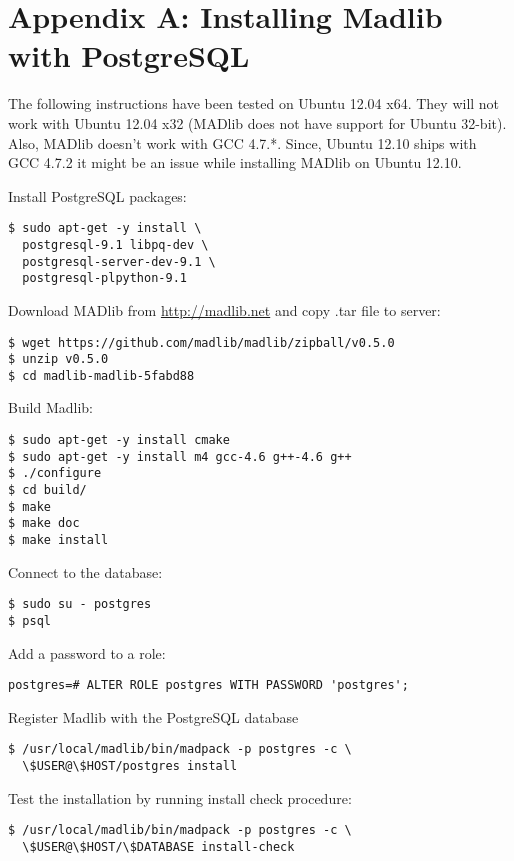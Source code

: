 
\section*{Appendix A: Installing Madlib with PostgreSQL}
The following instructions have been tested on Ubuntu 12.04 x64. They will not work with Ubuntu 12.04 x32 (MADlib does not have support for Ubuntu 32-bit). Also, MADlib doesn't work with GCC 4.7.*. Since,  Ubuntu 12.10 ships with GCC 4.7.2 it might be an issue while installing MADlib on Ubuntu 12.10.

\vspace{\baselineskip}
{\raggedleft Install PostgreSQL packages:}
\begin{verbatim}
$ sudo apt-get -y install \
  postgresql-9.1 libpq-dev \
  postgresql-server-dev-9.1 \
  postgresql-plpython-9.1
\end{verbatim}

{\raggedleft Download MADlib from \url{http://madlib.net} and copy .tar file to server:}
\begin{verbatim}
$ wget https://github.com/madlib/madlib/zipball/v0.5.0
$ unzip v0.5.0
$ cd madlib-madlib-5fabd88
\end{verbatim}

{\raggedleft Build Madlib:}
\begin{verbatim}
$ sudo apt-get -y install cmake
$ sudo apt-get -y install m4 gcc-4.6 g++-4.6 g++
$ ./configure
$ cd build/
$ make
$ make doc
$ make install
\end{verbatim}

{\raggedleft Connect to the database:}
\begin{verbatim}
$ sudo su - postgres
$ psql
\end{verbatim}

{\raggedleft Add a password to a role:}
\begin{verbatim}
postgres=# ALTER ROLE postgres WITH PASSWORD 'postgres';
\end{verbatim}

{\raggedleft Register Madlib with the PostgreSQL database}
\begin{verbatim}
$ /usr/local/madlib/bin/madpack -p postgres -c \ 
  \$USER@\$HOST/postgres install
\end{verbatim}

{\raggedleft Test the installation by running install check procedure:}
\begin{verbatim}
$ /usr/local/madlib/bin/madpack -p postgres -c \
  \$USER@\$HOST/\$DATABASE install-check
\end{verbatim}

